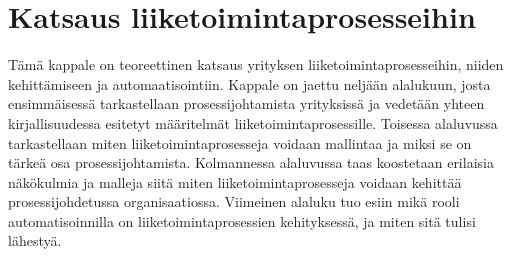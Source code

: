 \documentclass[finnish,12pt,a4paper,pdftex]{article}
\begin{document}
\clearpage

\section{Katsaus liiketoimintaprosesseihin}



Tämä kappale on teoreettinen katsaus yrityksen liiketoimintaprosesseihin, niiden kehittämiseen ja automaatisointiin. Kappale on jaettu neljään alalukuun, josta ensimmäisessä tarkastellaan prosessijohtamista yrityksissä ja vedetään yhteen kirjallisuudessa esitetyt määritelmät liiketoimintaprosessille. Toisessa alaluvussa tarkastellaan miten liiketoimintaprosesseja voidaan mallintaa ja miksi se on tärkeä osa prosessijohtamista. Kolmannessa alaluvussa taas
koostetaan erilaisia näkökulmia ja malleja siitä miten liiketoimintaprosesseja voidaan kehittää prosessijohdetussa organisaatiossa. Viimeinen alaluku tuo esiin mikä rooli automatisoinnilla on liiketoimintaprosessien kehityksessä, ja miten sitä tulisi lähestyä.



\end{document}
